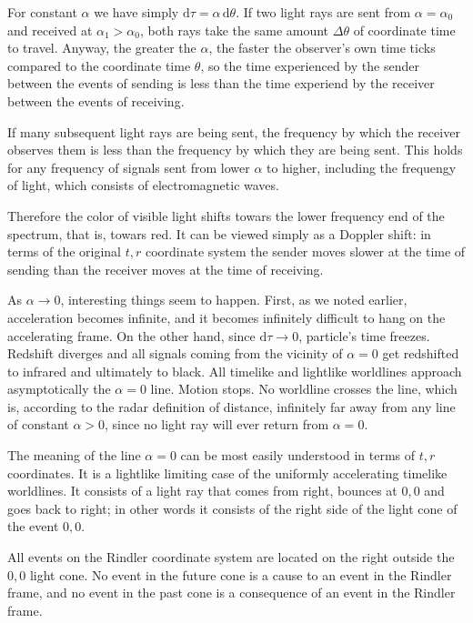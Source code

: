 \documentclass[11pt,oneside%
]{memoir}
\newcommand{\dd}{\mathrm{d}}
\begin{document}
For constant \(\alpha\) we have simply \(\dd\tau=\alpha\,\dd\theta\). If two light rays are sent from \(\alpha=\alpha_0\) and received at \(\alpha_1>\alpha_0\), both rays take the same amount \(\Delta\theta\) of coordinate time to travel. Anyway, the greater the \(\alpha\), the faster the observer's own time ticks compared to the coordinate time \(\theta\), so the time experienced by the sender between the events of sending is less than the time experiend by the receiver between the events of receiving.

If many subsequent light rays are being sent, the frequency by which the receiver observes them is less than the frequency by which they are being sent. This holds for any frequency of signals sent from lower \(\alpha\) to higher, including the frequengy of light, which consists of electromagnetic waves.

Therefore the color of visible light shifts towars the lower frequency end of the spectrum, that is, towars red. It can be viewed simply as a Doppler shift: in terms of the original \(t,r\) coordinate system the sender moves slower at the time of sending than the receiver moves at the time of receiving.

As \(\alpha\rightarrow0\), interesting things seem to happen. First, as we noted earlier, acceleration becomes infinite, and it becomes infinitely difficult to hang on the accelerating frame. On the other hand, since \(\dd\tau\rightarrow0\), particle's time freezes. Redshift diverges and all signals coming from the vicinity of \(\alpha=0\) get redshifted to infrared and ultimately to black. All timelike and lightlike worldlines approach asymptotically the \(\alpha=0\) line. Motion stops. No worldline crosses the line, which is, according to the radar definition of distance, infinitely far away from any line of constant \(\alpha>0\), since no light ray will ever return from \(\alpha=0\).

The meaning of the line \(\alpha=0\) can be most easily understood in terms of \(t,r\) coordinates. It is a lightlike limiting case of the uniformly accelerating timelike worldlines. It consists of a light ray that comes from right, bounces at \(0,0\) and goes back to right; in other words it consists of the right side of the light cone of the event \(0,0\).

All events on the Rindler coordinate system are located on the right outside the \(0,0\) light cone. No event in the future cone is a cause to an event in the Rindler frame, and no event in the past cone is a consequence of an event in the Rindler frame.
\end{document}

